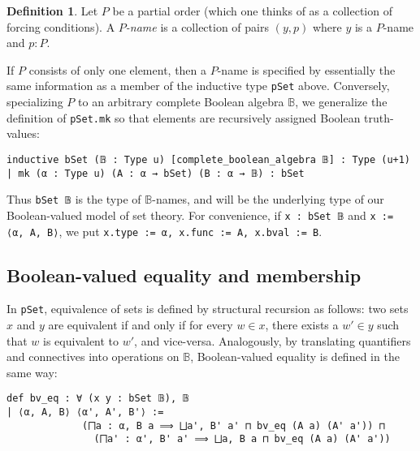 \documentclass[a4paper,USenglish,cleveref, autoref]{lipics-v2019}
\newcommand{\B}{\mathbb{B}}
\newcommand{\lil}{\lstinline}
\theoremstyle{definition}
\newtheorem{defn}[theorem]{Definition}
\begin{document}
\begin{defn}\label{def-p-name}
Let $P$ be a partial order (which one thinks of as a collection of forcing conditions). A \emph{$P$-name} is a collection of pairs $(y, p)$ where $y$ is a $P$-name and $p : P$.
\end{defn}

 If $P$ consists of only one element, then a $P$-name is specified by essentially the same information as a member of the inductive type \lstinline{pSet} above. Conversely, specializing $P$ to an arbitrary complete Boolean algebra $\B$, we generalize the definition of \lstinline{pSet.mk} so that elements are recursively assigned Boolean truth-values:
\begin{lstlisting}
inductive bSet (𝔹 : Type u) [complete_boolean_algebra 𝔹] : Type (u+1)
| mk (α : Type u) (A : α → bSet) (B : α → 𝔹) : bSet
\end{lstlisting}
Thus \lil{bSet 𝔹} is the type of $\B$-names, and will be the underlying type of our Boolean-valued model of set theory. For convenience, if \lstinline{x : bSet 𝔹} and \lstinline{x := ⟨α, A, B⟩}, we put \lstinline{x.type := α, x.func := A, x.bval := B}.

\subsection{Boolean-valued equality and membership}

In \lil{pSet}, equivalence of sets is defined by structural recursion as follows: two sets $x$ and $y$ are equivalent if and only if for every $w \in x$, there exists a $w' \in y$ such that $w$ is equivalent to $w'$, and vice-versa. Analogously, by translating quantifiers and connectives into operations on $\B$, Boolean-valued equality is defined in the same way:
\begin{lstlisting}
def bv_eq : ∀ (x y : bSet 𝔹), 𝔹
| ⟨α, A, B⟩ ⟨α', A', B'⟩ :=
             (⨅a : α, B a ⟹ ⨆a', B' a' ⊓ bv_eq (A a) (A' a')) ⊓
               (⨅a' : α', B' a' ⟹ ⨆a, B a ⊓ bv_eq (A a) (A' a'))
\end{lstlisting}
\end{document}
